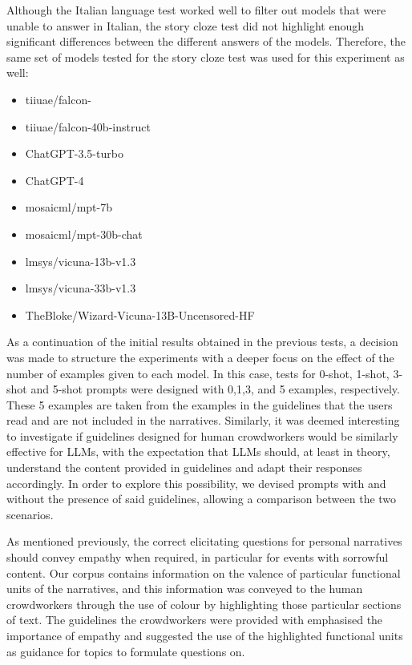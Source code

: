 Although the Italian language test worked well to filter out models that were unable to answer in Italian, the story cloze test did not highlight enough significant differences between the different answers of the models.
Therefore, the same set of models tested for the story cloze test was used for this experiment as well:
\begin{itemize}
    \item   tiiuae/falcon- \cite{falcon40b}
    \item   tiiuae/falcon-40b-instruct \cite{falcon40b}
    \item   ChatGPT-3.5-turbo \cite{chatgpt}
    \item   ChatGPT-4 \cite{openai2023gpt4}
    \item   mosaicml/mpt-7b \cite{mpt7b}
    \item   mosaicml/mpt-30b-chat \cite{mpt30b}
    \item   lmsys/vicuna-13b-v1.3 \cite{touvronllama}
    \item   lmsys/vicuna-33b-v1.3 \cite{touvronllama}
    \item   TheBloke/Wizard-Vicuna-13B-Uncensored-HF \cite{wizard-vicuna}
\end{itemize}
As a continuation of the initial results obtained in the previous tests, a decision was made to structure the experiments with a deeper focus on the effect of the number of examples given to each model. In this case, tests for 0-shot, 1-shot, 3-shot and 5-shot prompts were designed with 0,1,3, and 5 examples, respectively. These 5 examples are taken from the examples in the guidelines that the users read and are not included in the narratives. Similarly, it was deemed interesting to investigate if guidelines designed for human crowdworkers would be similarly effective for LLMs, with the expectation that LLMs should, at least in theory, understand the content provided in guidelines and adapt their responses accordingly. In order to explore this possibility, we devised prompts with and without the presence of said guidelines, allowing a comparison between the two scenarios.

As mentioned previously, the correct elicitating questions for personal narratives should convey empathy when required, in particular for events with sorrowful content. Our corpus contains information on the valence of particular functional units of the narratives, and this information was conveyed to the human crowdworkers through the use of colour by highlighting those particular sections of text. The guidelines the crowdworkers were provided with emphasised the importance of empathy and suggested the use of the highlighted functional units as guidance for topics to formulate questions on. 


